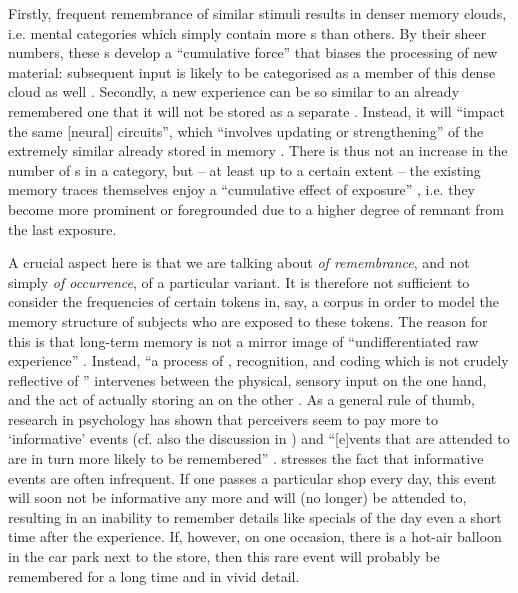 Firstly, frequent remembrance of similar stimuli results in denser memory clouds, i.e. mental categories which simply contain more s than others.
By their sheer numbers, these s develop a ``cumulative force'' that biases the processing of new material: subsequent input is likely to be categorised as a member of this dense cloud as well \parencite[cf.][524]{pierrehumbert2006}.
Secondly, a new experience can be so similar to an already remembered one that it will not be stored as a separate .
Instead, it will ``impact the same [neural] circuits'', which ``involves updating or strengthening'' of the extremely similar  already stored in memory \parencite[525]{pierrehumbert2006}.
There is thus not an increase in the number of s in a category, but -- at least up to a certain extent -- the existing memory traces themselves enjoy a ``cumulative effect of exposure'' \parencite[525]{pierrehumbert2006}, i.e. they become more prominent or foregrounded due to a higher degree of remnant  from the last exposure.

A crucial aspect here is that we are talking about \emph{ of remembrance}, and not simply \emph{ of occurrence}, of a particular variant.
It is therefore not sufficient to consider the frequencies of certain tokens in, say, a corpus in order to model the memory structure of subjects who are exposed to these tokens.
The reason for this is that long-term memory is not a mirror image of ``undifferentiated raw experience'' \parencite[525]{pierrehumbert2006}.
Instead, ``a process of , recognition, and coding which is not crudely reflective of '' intervenes between the physical, sensory input on the one hand, and the act of actually storing an  on the other \parencite[525]{pierrehumbert2006}.
As a general rule of thumb, research in psychology has shown that perceivers seem to pay more  to `informative' events (cf. also the discussion in \citealt{racz2013}) and ``[e]vents that are attended to are in turn more likely to be remembered'' \parencite[525]{pierrehumbert2006}.
\textcite[cf.][525]{pierrehumbert2006} stresses the fact that informative events are often infrequent.
If one passes a particular shop every day, this event will soon not be informative any more and will (no longer) be attended to, resulting in an inability to remember details like specials of the day even a short time after the experience.
If, however, on one occasion, there is a hot-air balloon in the car park next to the store, then this rare event will probably be remembered for a long time and in vivid detail.

